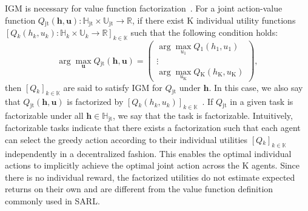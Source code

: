 \documentclass{article}
\newcommand{\jointactionspace}{\mathbb{U}}
\newcommand{\jointaction}{\mathbf{u}}
\newcommand{\action}{u}
\newcommand{\jointobservationhistoryspace}{\mathbb{H}}
\newcommand{\jointobservationhistory}{\mathbf{h}}
\newcommand{\observationhistory}{h}
\newcommand{\agentspace}{\mathbb{K}}
\newcommand{\agentcounter}{k}
\newcommand{\numberofagents}{\mathrm{K}}
\newcommand{\utilityexp}{Q}
\newcommand{\joint}{\mathrm{jt}}
\newcounter{definition}
\begin{document}
IGM is necessary for value function factorization~\cite{Son2019QTRAN}. For a joint action-value function $\utilityexp{}_{\joint{}}(\jointobservationhistory{},\jointaction{}): \jointobservationhistoryspace_{\joint} \times \jointactionspace_{\joint} \rightarrow\mathbb{R}$, if there exist $\numberofagents{}$ individual utility functions $[\utilityexp{}_\agentcounter{}(\observationhistory{}_\agentcounter{},\action{}_\agentcounter{}): \jointobservationhistoryspace{}_{\agentcounter{}} \times \jointactionspace{}_{\agentcounter{}} \rightarrow\mathbb{R}]_{\agentcounter{}\in\agentspace{}}$ such that the following condition holds:
\begin{equation}
\arg\max_\jointaction{} \utilityexp{}_{\joint{}}(\jointobservationhistory{},\jointaction{}) =
\begin{pmatrix}
\arg\max_{\action{}_1} \utilityexp{}_1(\observationhistory{}_1,\action{}_1)\\
\vdots \\
\arg\max_{\action{}_\numberofagents{}} \utilityexp{}_\numberofagents{}(\observationhistory{}_\numberofagents{},\action{}_\numberofagents{})
\end{pmatrix},
\label{eq:igm}
\end{equation}
then $[\utilityexp{}_\agentcounter{}]_{\agentcounter{}\in\agentspace{}}$ are said to satisfy IGM for $\utilityexp{}_{\joint{}}$ under $\jointobservationhistory{}$. In this case, we also say that $\utilityexp{}_{\joint{}}(\jointobservationhistory{},\jointaction{})$ is factorized by $[\utilityexp{}_\agentcounter{}(\observationhistory{}_\agentcounter{},\action{}_\agentcounter{})]_{\agentcounter{}\in\agentspace{}}$~\cite{Son2019QTRAN}. If $\utilityexp{}_{\joint{}}$ in a given task is factorizable under all $\jointobservationhistory{}\in \jointobservationhistoryspace_{\joint}$, we say that the task is factorizable. Intuitively, factorizable tasks indicate that there exists a factorization such that each agent can select the greedy action according to their individual utilities $[\utilityexp{}_\agentcounter{}]_{\agentcounter{}\in\agentspace{}}$ independently in a decentralized fashion. This enables the optimal individual actions to implicitly achieve the optimal joint action across the $\numberofagents{}$ agents. Since there is no individual reward, the factorized utilities do not estimate expected returns on their own \cite{Guestrin2001Utility} and are different from the value function definition commonly used in SARL.
\end{document}
